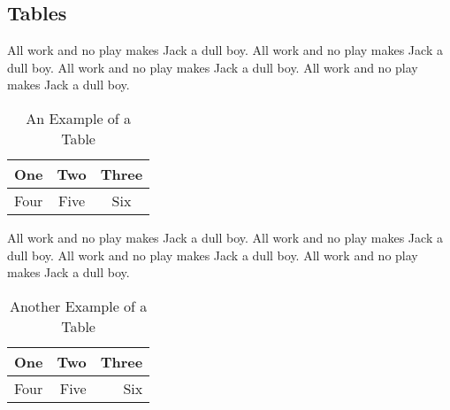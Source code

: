 
%
%

%
%

\subsection{Tables}
\label{sec:discussion_tables}

All work and no play makes Jack a dull boy.
All work and no play makes Jack a dull boy.
All work and no play makes Jack a dull boy.
All work and no play makes Jack a dull boy.

\begin{table}[h]
\caption{An Example of a Table}
\label{tab:table_a}
\begin{center}
\begin{tabular}{|c||c|c|}
\hline
One & Two & Three\\
\hline
Four & Five & Six\\
\hline
\end{tabular}
\end{center}
\end{table}

All work and no play makes Jack a dull boy.
All work and no play makes Jack a dull boy.
All work and no play makes Jack a dull boy.
All work and no play makes Jack a dull boy.

\begin{table}[h]
\caption{Another Example of a Table}
\label{tab:table_b}
\begin{center}
\begin{tabular}{lrr}
\hline
One & Two & Three\\
\hline
Four & Five & Six\\
\hline
\end{tabular}
\end{center}
\end{table}
